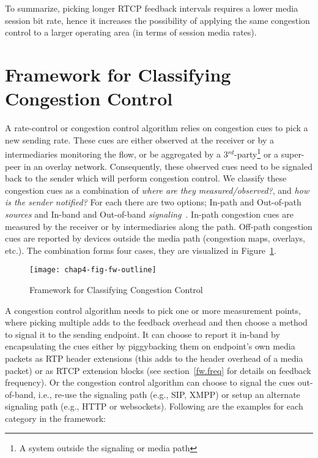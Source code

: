 To summarize, picking longer RTCP feedback intervals requires a lower media
session bit rate, hence it increases the possibility of applying the same
congestion control to a larger operating area (in terms of session media
rates).

\section{Framework for Classifying Congestion Control}
\label{fw.fw}

A rate-control or congestion control algorithm relies on congestion cues to
pick a new sending rate. These cues are either observed at the receiver or by
a intermediaries monitoring the flow, or be aggregated by a
3$^{rd}$-party\footnote{A system outside the signaling or media path} or a
super-peer in an overlay network. Consequently, these observed cues need to be
signaled back to the sender which will perform congestion control. We classify
these congestion cues as a combination of \emph{where are they
measured/observed?}, and \emph{how is the sender notified?} For each there are
two options; In-path and Out-of-path \emph{sources} and In-band and Out-of-band 
\emph{signaling}~\cite{Singh:PhDFw}. In-path congestion cues are measured
by the receiver or by intermediaries along the path. Off-path congestion
cues are reported by devices outside the media path (congestion maps,
overlays, etc.). The combination forms four cases, they are visualized in
Figure~\ref{fig:4:fw}.

\begin{figure}
\texttt{[image: chap4-fig-fw-outline]}
\caption{Framework for Classifying Congestion Control~\cite{Singh:PhDFw}}
\label{fig:4:fw}
\end{figure}

A congestion control algorithm needs to pick one or more measurement points,
where picking multiple adds to the feedback overhead and then choose a method
to signal it to the sending endpoint. It can choose to report it in-band by
encapsulating the cues either by piggybacking them on endpoint's own media
packets as RTP header extensions (this adds to the header overhead of a media
packet) or as RTCP extension blocks (see section~\ref{fw.freq} for details on
feedback frequency). Or the congestion control algorithm can choose to signal
the cues out-of-band, i.e., re-use the signaling path (e.g., SIP, XMPP) or
setup an alternate signaling path (e.g., HTTP or websockets). Following are
the examples for each category in the framework:

